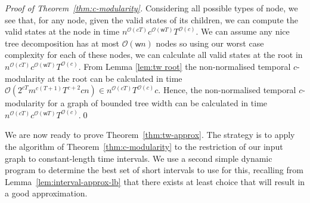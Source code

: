 \documentclass[runningheads]{llncs}
\newcommand{\w}{\mathsf{w}}
\begin{document}
\begin{proof}[Proof of Theorem~\ref{thm:c-modularity}]
Considering all possible types of node, we see that, for any node, given the valid states of its children, we can compute the valid states at the node in time $n^{\mathcal{O}(cT)}c^{\mathcal{O}(\w T)}T^{\mathcal{O}(c)}$.  We can assume any nice tree decomposition has at most $\mathcal{O}(\w n)$ nodes\cite{cygan2015Algorithms} so using our worst case complexity for each of these nodes, we can calculate all valid states at the root in $n^{\mathcal{O}(cT)}c^{\mathcal{O}(\w T)}T^{\mathcal{O}(c)}$.  From Lemma \ref{lem:tw root} the non-normalised temporal $c$-modularity at the root can be calculated in time $\mathcal{O}(2^{cT}m^{c(T+1)}T^{c+2}cn) \in n^{\mathcal{O}(cT)}T^{\mathcal{O}(c)}c$.  Hence, the non-normalised temporal $c$-modularity for a graph of bounded tree width can be calculated in time $n^{\mathcal{O}(cT)}c^{\mathcal{O}(\w T)}T^{\mathcal{O}(c)}$.\qed
\end{proof} 
%
We are now ready to prove Theorem~\ref{thm:tw-approx}.  The strategy is to apply the algorithm of Theorem~\ref{thm:c-modularity} to the restriction of our input graph to constant-length time intervals.  We use a second simple dynamic program to determine the best set of short intervals to use for this, recalling from Lemma~\ref{lem:interval-approx-lb} that there exists at least choice that will result in a good approximation.
%
\end{document}
